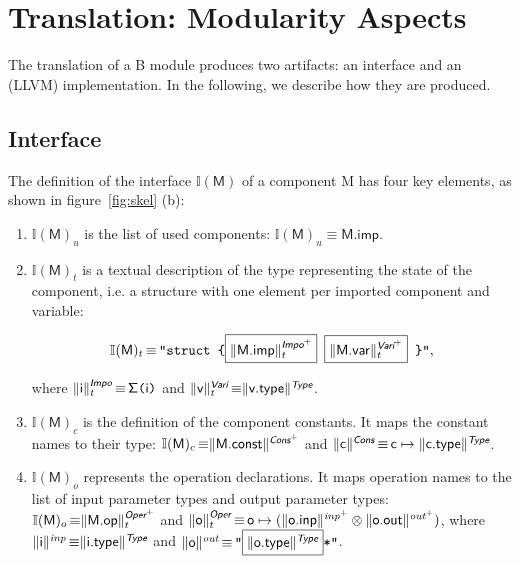 \documentclass{llncs}
\newcommand{\trad}[2]{\ensuremath{\lVert \textsf{#1} \rVert^{\textit{#2}}}}
\DeclareMathOperator{\isdef}{\equiv}
\newcommand{\llvm}[1]{\texttt{#1}}
\newcommand{\B}[1]{\textsf{#1}}
\newcommand{\ListOf}[1]{$\mbox{#1}^+$}
\newcommand{\PH}[1]{\framebox{$#1$}}
\newcommand{\sep}[0]{\otimes}
\newcommand{\intf}[0]{\ensuremath{\mathbb{I}}}
\newcommand{\state}[0]{\ensuremath{\sf\Sigma}}
\begin{document}
\section{Translation: Modularity Aspects}
\label{sec:module}

The translation of a B module produces two artifacts: an interface and an (LLVM)
implementation. In the following, we describe how they are produced.

\subsection{Interface}

The definition of the interface $\intf(\B{M})$ of a component \B{M} has four
key elements, as shown in figure~\ref{fig:skel} (b):
\begin{enumerate}
\item $\intf(\B{M})_u$ is the list of used components: $\intf(\B{M})_u \isdef \B{M.imp}$.

\item $\intf(\B{M})_t$ is a textual description of the type representing the
  state of the component, i.e. a structure with one element per imported
  component and variable:
\begin{small}
$$\intf(\B{M})_t \isdef \llvm{"struct \{\PH{\trad{\B{M.imp}}{\ListOf{\B{Impo}}}_t} \PH{\trad{\B{M.var}}{\ListOf{\B{Vari}}}_t} \}"},$$
\end{small}
where $\trad{\B{i}}{\B{Impo}}_t \isdef \llvm{\state(\B{i})}$ and
$\trad{\B{v}}{\B{Vari}}_t \isdef \trad{\B{v.type}}{\B{Type}}$.

\item $\intf(\B{M})_c$ is the definition of the component constants. It maps
the constant names to their type:
$\intf(\B{M})_c \isdef \trad{\B{M.const}}{\ListOf{\B{Cons}}}$ and
$\trad{\B{c}}{\B{Cons}} \isdef \B{c} \mapsto \trad{\B{c.type}}{\B{Type}}$.

\item $\intf(\B{M})_o$ represents the operation declarations. It maps
operation names to the list of input parameter types and output parameter
types:
$\intf(\B{M})_o \isdef \trad{\B{M.op}}{\ListOf{\B{Oper}}}_t$ and
$\trad{\B{o}}{\B{Oper}}_t \isdef \B{o} \mapsto ( \trad{\B{o.inp}}{\ListOf{inp}} \sep \trad{\B{o.out}}{\ListOf{out}} )$, where
$\trad{\B{i}}{inp} \isdef \trad{\B{i.type}}{\B{Type}}$ and
$\trad{\B{o}}{out} \isdef \llvm{"\PH{\trad{\B{o.type}}{\B{Type}}}*"}$.
\end{enumerate}
\end{document}
